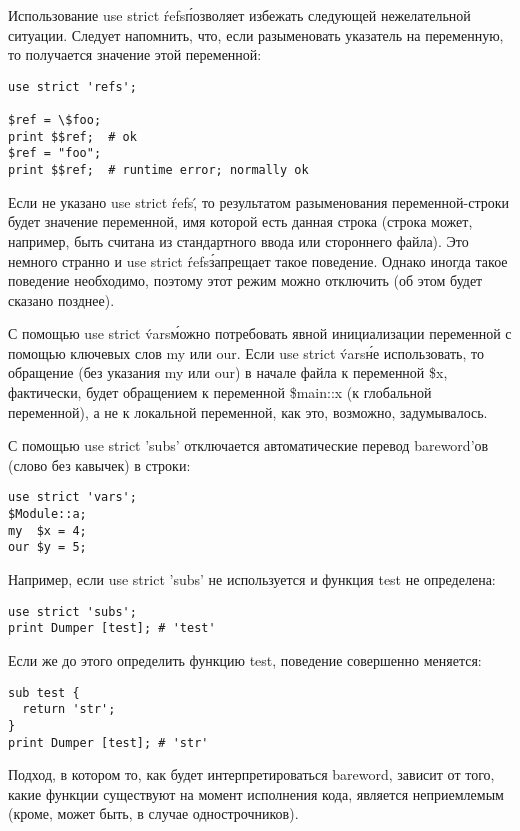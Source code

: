 Использование use strict \'refs\' позволяет избежать следующей нежелательной ситуации. Следует напомнить, что, если разыменовать указатель на переменную, то получается значение этой переменной:
\begin{verbatim}
use strict 'refs';

$ref = \$foo;
print $$ref;  # ok
$ref = "foo";
print $$ref;  # runtime error; normally ok
\end{verbatim}
Если не указано use strict \'refs\', то результатом разыменования переменной-строки будет значение переменной, имя которой есть данная строка (строка может, например, быть считана из стандартного ввода или стороннего файла). Это немного странно и use strict \'refs\' запрещает такое поведение. Однако иногда такое поведение необходимо, поэтому этот режим можно отключить (об этом будет сказано позднее).

С помощью use strict \'vars\' можно потребовать явной инициализации переменной с помощью ключевых слов my или our. Если use strict \'vars\' не использовать, то обращение (без указания my или our) в начале файла к переменной \$x, фактически, будет обращением к переменной \$main::x (к глобальной переменной), а не к локальной переменной, как это, возможно, задумывалось.

С помощью use strict 'subs' отключается автоматические перевод bareword'ов (слово без кавычек) в строки:
\begin{verbatim}
use strict 'vars';
$Module::a;
my  $x = 4;
our $y = 5;
\end{verbatim}
Например, если use strict 'subs' не используется и функция test не определена:
\begin{verbatim}
use strict 'subs';
print Dumper [test]; # 'test'
\end{verbatim}
Если же до этого определить функцию test, поведение совершенно меняется:
\begin{verbatim}
sub test {
  return 'str';
}
print Dumper [test]; # 'str'
\end{verbatim}
Подход, в котором то, как будет интерпретироваться bareword, зависит от того, какие функции существуют на момент исполнения кода, является неприемлемым (кроме, может быть, в случае однострочников).

